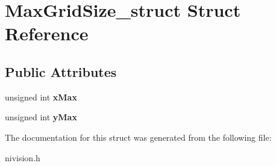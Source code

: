 \hypertarget{structMaxGridSize__struct}{
\section{MaxGridSize\_\-struct Struct Reference}
\label{structMaxGridSize__struct}
}
\subsection*{Public Attributes}
\begin{DoxyCompactItemize}
\item 
\hypertarget{structMaxGridSize__struct_a40e399ff3d6bef878fea78d136c18da6}{
unsigned int {\bfseries xMax}}
\label{structMaxGridSize__struct_a40e399ff3d6bef878fea78d136c18da6}

\item 
\hypertarget{structMaxGridSize__struct_afdac3b750ffe072962a9a4a156bc144d}{
unsigned int {\bfseries yMax}}
\label{structMaxGridSize__struct_afdac3b750ffe072962a9a4a156bc144d}

\end{DoxyCompactItemize}


The documentation for this struct was generated from the following file:\begin{DoxyCompactItemize}
\item 
nivision.h\end{DoxyCompactItemize}
